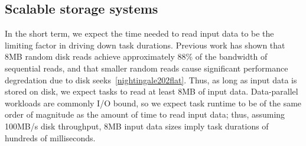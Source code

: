 





\subsection{Scalable storage systems}

In the short term, we expect the time needed to read input data to be the
limiting factor in driving down task durations.
Previous work has shown that 8MB random disk reads achieve approximately 88\%
of the bandwidth of sequential reads, and that smaller
random reads cause significant performance degredation due to disk seeks~\ref{nightingale202flat}. Thus, as long as input data is stored on disk, we
expect tasks to read at least 8MB of input data. Data-parallel
workloads are commonly I/O bound, so we expect task runtime to be of the
same order of magnitude as the amount of time to read input data; thus,
assuming 100MB/s disk throughput, 8MB input data sizes imply task durations
of hundreds of milliseconds.

